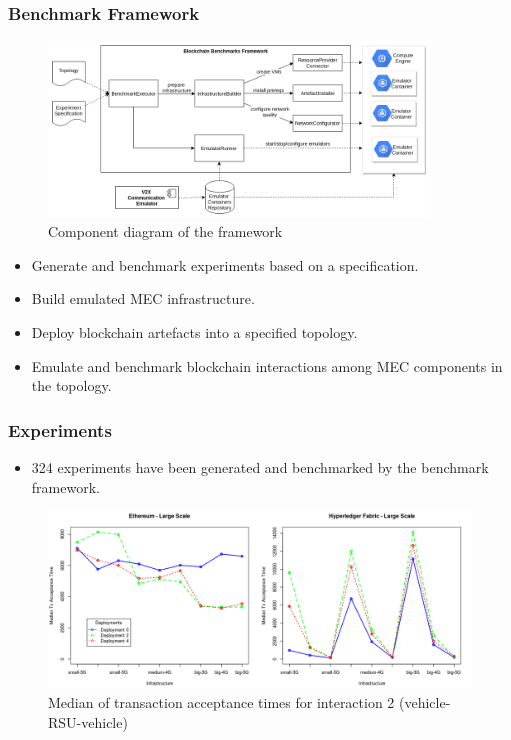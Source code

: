 \documentclass{beamer}
\begin{document}
		\begin{frame}
			\frametitle{Benchmark Framework}
			
			\begin{figure}[h]
				\centering
				\includegraphics[width=0.9\textwidth]{figures/benchmark_framework_component_diagram.png}
				\vspace{-0.5cm}
				\caption{Component diagram of the framework}
				\label{fig:benchmark_framework_component}
			\end{figure}
			
			\vspace{-0.5cm}
			\begin{itemize}
				\item Generate and benchmark experiments based on a specification.
				\item Build emulated MEC infrastructure.
				\item Deploy blockchain artefacts into a specified topology.
				\item Emulate and benchmark blockchain interactions among MEC components in the topology.
			\end{itemize}
		
		\end{frame}
		
		\begin{frame}
			\frametitle{Experiments}
			\begin{itemize}
				\item 324 experiments have been generated and benchmarked by the benchmark framework.
			\end{itemize}
			
			\begin{figure}
				\centering
				\includegraphics[width=\textwidth]{figures/interaction2_large_scale_median_times.png}
				\vspace{-0.5cm}
				\caption{Median of transaction acceptance times for interaction 2 (vehicle-\gls{RSU}-vehicle)}
				\label{fig:experiments1}
			\end{figure}
		
		\end{frame}
		
\end{document}
